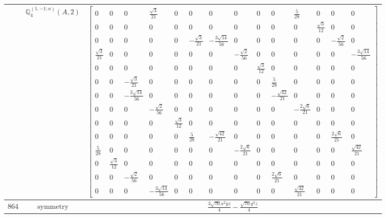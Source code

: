 \documentclass[fleqn,8pt,landscape]{jsarticle}
\begin{document}
\begin{longtable}{ccc}
$  $ & $ \mathbb{Q}_{4}^{(1,-1;a)}(A,2) $ & $ \begin{bmatrix} 0 & 0 & 0 & \frac{\sqrt{3}}{21} & 0 & 0 & 0 & 0 & 0 & 0 & \frac{5}{28} & 0 & 0 & 0 \\ 0 & 0 & 0 & 0 & 0 & 0 & 0 & 0 & 0 & 0 & 0 & \frac{\sqrt{3}}{12} & 0 & 0 \\ 0 & 0 & 0 & 0 & 0 & - \frac{\sqrt{3}}{21} & - \frac{3 \sqrt{14}}{56} & 0 & 0 & 0 & 0 & 0 & - \frac{\sqrt{2}}{56} & 0 \\ \frac{\sqrt{3}}{21} & 0 & 0 & 0 & 0 & 0 & 0 & - \frac{\sqrt{2}}{56} & 0 & 0 & 0 & 0 & 0 & - \frac{3 \sqrt{14}}{56} \\ 0 & 0 & 0 & 0 & 0 & 0 & 0 & 0 & \frac{\sqrt{3}}{12} & 0 & 0 & 0 & 0 & 0 \\ 0 & 0 & - \frac{\sqrt{3}}{21} & 0 & 0 & 0 & 0 & 0 & 0 & \frac{5}{28} & 0 & 0 & 0 & 0 \\ 0 & 0 & - \frac{3 \sqrt{14}}{56} & 0 & 0 & 0 & 0 & 0 & 0 & - \frac{\sqrt{42}}{21} & 0 & 0 & 0 & 0 \\ 0 & 0 & 0 & - \frac{\sqrt{2}}{56} & 0 & 0 & 0 & 0 & 0 & 0 & - \frac{2 \sqrt{6}}{21} & 0 & 0 & 0 \\ 0 & 0 & 0 & 0 & \frac{\sqrt{3}}{12} & 0 & 0 & 0 & 0 & 0 & 0 & 0 & 0 & 0 \\ 0 & 0 & 0 & 0 & 0 & \frac{5}{28} & - \frac{\sqrt{42}}{21} & 0 & 0 & 0 & 0 & 0 & \frac{2 \sqrt{6}}{21} & 0 \\ \frac{5}{28} & 0 & 0 & 0 & 0 & 0 & 0 & - \frac{2 \sqrt{6}}{21} & 0 & 0 & 0 & 0 & 0 & \frac{\sqrt{42}}{21} \\ 0 & \frac{\sqrt{3}}{12} & 0 & 0 & 0 & 0 & 0 & 0 & 0 & 0 & 0 & 0 & 0 & 0 \\ 0 & 0 & - \frac{\sqrt{2}}{56} & 0 & 0 & 0 & 0 & 0 & 0 & \frac{2 \sqrt{6}}{21} & 0 & 0 & 0 & 0 \\ 0 & 0 & 0 & - \frac{3 \sqrt{14}}{56} & 0 & 0 & 0 & 0 & 0 & 0 & \frac{\sqrt{42}}{21} & 0 & 0 & 0 \end{bmatrix} $ \\ \hline
$ 864 $ & $ \text{symmetry} $ & $ \frac{3 \sqrt{70} x^{2} y z}{4} - \frac{\sqrt{70} y^{3} z}{4} $ \\

\end{longtable}
\end{document}
